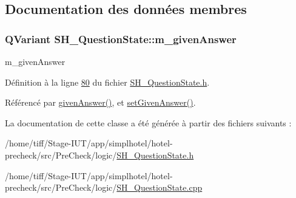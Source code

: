 \subsection{Documentation des données membres}
\hypertarget{classSH__QuestionState_a309bb96a6aed67d190f9ab995fdc7c61}{
\subsubsection[{m\-\_\-given\-Answer}]{\setlength{\rightskip}{0pt plus 5cm}Q\-Variant S\-H\-\_\-\-Question\-State\-::m\-\_\-given\-Answer\hspace{0.3cm}{\ttfamily [private]}}}\label{classSH__QuestionState_a309bb96a6aed67d190f9ab995fdc7c61}


m\-\_\-given\-Answer 



Définition à la ligne \hyperlink{SH__QuestionState_8h_source_l00080}{80} du fichier \hyperlink{SH__QuestionState_8h_source}{S\-H\-\_\-\-Question\-State.\-h}.



Référencé par \hyperlink{classSH__QuestionState_abde97c61175be95358ece622fd16593e}{given\-Answer()}, et \hyperlink{classSH__QuestionState_a9d285a34a7002fd05a7fa8ff9139c264}{set\-Given\-Answer()}.



La documentation de cette classe a été générée à partir des fichiers suivants \-:\begin{DoxyCompactItemize}
\item 
/home/tiff/\-Stage-\/\-I\-U\-T/app/simplhotel/hotel-\/precheck/src/\-Pre\-Check/logic/\hyperlink{SH__QuestionState_8h}{S\-H\-\_\-\-Question\-State.\-h}\item 
/home/tiff/\-Stage-\/\-I\-U\-T/app/simplhotel/hotel-\/precheck/src/\-Pre\-Check/logic/\hyperlink{SH__QuestionState_8cpp}{S\-H\-\_\-\-Question\-State.\-cpp}\end{DoxyCompactItemize}

